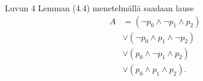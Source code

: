 \documentclass[11pt,a4paper]{amsart}
\begin{document}
\begin{solution}
Luvun 4 Lemman (4.4) menetelmällä saadaan lause
\[
\begin{aligned}
A &= (\neg p_0 \land \neg p_1 \land p_2) \\
&\lor (\neg p_0 \land p_1 \land \neg p_2) \\
&\lor (p_0 \land \neg p_1 \land p_2) \\
&\lor (p_0 \land p_1 \land p_2).
\end{aligned}
\]
\end{solution}

\begin{exercise}[Haastetehtävä]
\end{exercise}

\begin{solution}
\end{solution}
\end{document}
